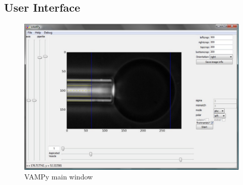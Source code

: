\subsection{User Interface}\label{vampy-ui}
\begin{figure}[htbp]
	\centering
		\includegraphics[width=1.00\textwidth]{figs/vampy_ui.pdf}
	\caption{VAMPy main window}
	\label{fig:vampyui}
\end{figure}
